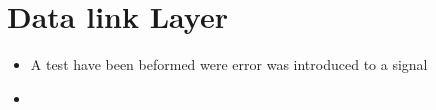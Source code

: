 \section{Data link Layer}

\begin{itemize}
\item A test have been beformed were error was introduced to a signal
\item 
\end{itemize}